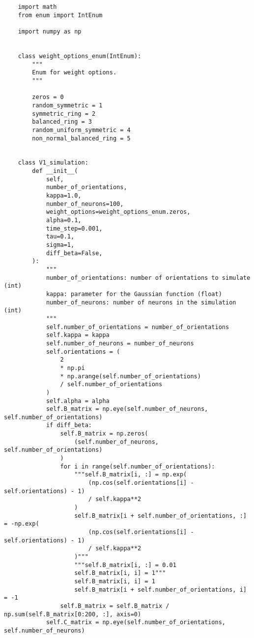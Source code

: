 \documentclass[a4paper, 11pt, oneside]{report}
\begin{document}
\begin{verbatim}
    import math
    from enum import IntEnum
    
    import numpy as np
    
    
    class weight_options_enum(IntEnum):
        """
        Enum for weight options.
        """
    
        zeros = 0
        random_symmetric = 1
        symmetric_ring = 2
        balanced_ring = 3
        random_uniform_symmetric = 4
        non_normal_balanced_ring = 5
    
    
    class V1_simulation:
        def __init__(
            self,
            number_of_orientations,
            kappa=1.0,
            number_of_neurons=100,
            weight_options=weight_options_enum.zeros,
            alpha=0.1,
            time_step=0.001,
            tau=0.1,
            sigma=1,
            diff_beta=False,
        ):
            """
            number_of_orientations: number of orientations to simulate (int)
            kappa: parameter for the Gaussian function (float)
            number_of_neurons: number of neurons in the simulation (int)
            """
            self.number_of_orientations = number_of_orientations
            self.kappa = kappa
            self.number_of_neurons = number_of_neurons
            self.orientations = (
                2
                * np.pi
                * np.arange(self.number_of_orientations)
                / self.number_of_orientations
            )
            self.alpha = alpha
            self.B_matrix = np.eye(self.number_of_neurons, self.number_of_orientations)
            if diff_beta:
                self.B_matrix = np.zeros(
                    (self.number_of_neurons, self.number_of_orientations)
                )
                for i in range(self.number_of_orientations):
                    """self.B_matrix[i, :] = np.exp(
                        (np.cos(self.orientations[i] - self.orientations) - 1)
                        / self.kappa**2
                    )
                    self.B_matrix[i + self.number_of_orientations, :] = -np.exp(
                        (np.cos(self.orientations[i] - self.orientations) - 1)
                        / self.kappa**2
                    )"""
                    """self.B_matrix[i, :] = 0.01
                    self.B_matrix[i, i] = 1"""
                    self.B_matrix[i, i] = 1
                    self.B_matrix[i + self.number_of_orientations, i] = -1
                self.B_matrix = self.B_matrix / np.sum(self.B_matrix[0:200, :], axis=0)
            self.C_matrix = np.eye(self.number_of_orientations, self.number_of_neurons)
    

\end{verbatim}
\end{document}
